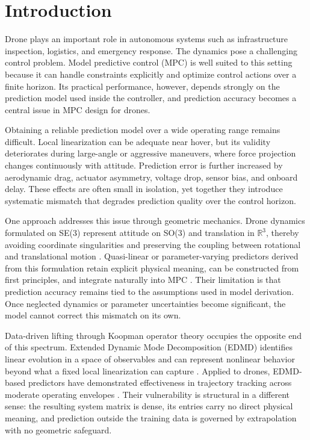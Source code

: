 \documentclass{article}
\begin{document}
\maketitle

\section{Introduction}

Drone plays an important role in autonomous systems such as infrastructure inspection, logistics, and emergency response. The dynamics pose a challenging control problem. Model predictive control (MPC) is well suited to this setting because it can handle constraints explicitly and optimize control actions over a finite horizon. Its practical performance, however, depends strongly on the prediction model used inside the controller, and prediction accuracy becomes a central issue in MPC design for drones.

Obtaining a reliable prediction model over a wide operating range remains difficult. Local linearization can be adequate near hover, but its validity deteriorates during large-angle or aggressive maneuvers, where force projection changes continuously with attitude. Prediction error is further increased by aerodynamic drag, actuator asymmetry, voltage drop, sensor bias, and onboard delay. These effects are often small in isolation, yet together they introduce systematic mismatch that degrades prediction quality over the control horizon.

One approach addresses this issue through geometric mechanics. Drone dynamics formulated on SE(3) represent attitude on SO(3) and translation in $\mathbb{R}^{3}$, thereby avoiding coordinate singularities and preserving the coupling between rotational and translational motion \cite{lee2010,lee2013}. Quasi-linear or parameter-varying predictors derived from this formulation retain explicit physical meaning, can be constructed from first principles, and integrate naturally into MPC \cite{rajkumar2025}. Their limitation is that prediction accuracy remains tied to the assumptions used in model derivation. Once neglected dynamics or parameter uncertainties become significant, the model cannot correct this mismatch on its own.

Data-driven lifting through Koopman operator theory occupies the opposite end of this spectrum. Extended Dynamic Mode Decomposition (EDMD) identifies linear evolution in a space of observables and can represent nonlinear behavior beyond what a fixed local linearization can capture \cite{williams2015,korda2018}. Applied to drones, EDMD-based predictors have demonstrated effectiveness in trajectory tracking across moderate operating envelopes \cite{narayanan2023,zinage2021}. Their vulnerability is structural in a different sense: the resulting system matrix is dense, its entries carry no direct physical meaning, and prediction outside the training data is governed by extrapolation with no geometric safeguard.
\end{document}
